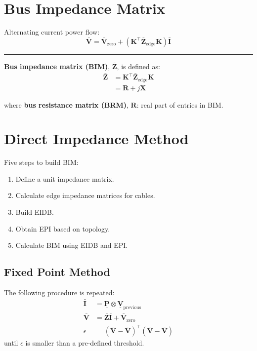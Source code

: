 \documentclass[
]{book}
\providecommand{\tightlist}{%
  \setlength{\itemsep}{0pt}\setlength{\parskip}{0pt}}
\begin{document}
\hypertarget{BIM}{%
\section{Bus Impedance Matrix}\label{BIM}}

Alternating current power flow:
\[
  \bar{\boldsymbol{V}} = \bar{\boldsymbol{V}}_{\text{zero}}
    + \left( \boldsymbol{K}^{\top} \boldsymbol{\bar{Z}}_\text{edge}
    \boldsymbol{K} \right) \bar{\boldsymbol{I}}
\]

\begin{center}\rule{0.5\linewidth}{0.5pt}\end{center}

\textbf{Bus impedance matrix (BIM)}, \(\boldsymbol{\bar{Z}}\), is defined as:
\[ \begin{aligned}
  \boldsymbol{\bar{Z}}
    &= \boldsymbol{K}^{\top} \boldsymbol{\bar{Z}}_\text{edge}
    \boldsymbol{K} \\
    &= \boldsymbol{R} + j \boldsymbol{X}
\end{aligned} \]

where \textbf{bus resistance matrix (BRM)}, \(\boldsymbol{R}\): real part of entries
in BIM.

\hypertarget{power-flow}{%
\section{Direct Impedance Method}\label{power-flow}}

Five steps to build BIM:

\begin{enumerate}
\def\labelenumi{\arabic{enumi}.}
\tightlist
\item
  Define a unit impedance matrix.
\item
  Calculate edge impedance matrices for cables.
\item
  Build EIDB.
\item
  Obtain EPI based on topology.
\item
  Calculate BIM using EIDB and EPI.
\end{enumerate}

\hypertarget{fixed-point-method}{%
\subsection*{Fixed Point Method}\label{fixed-point-method}}

The following procedure is repeated:
\[ \begin{aligned}
    \boldsymbol{\bar{I}} &= \boldsymbol{\underline{P}}
      \otimes \boldsymbol{\underline{V}}_\text{previous} \\
    \boldsymbol{\bar{V}}
    &= \boldsymbol{\bar{Z}} \boldsymbol{\bar{I}}
      + \boldsymbol{\bar{V}}_\text{zero} \\
    \epsilon
    &= \left( \boldsymbol{\bar{V}} - \boldsymbol{\bar{V}} \right)^\top
      \left( \boldsymbol{\bar{V}} - \boldsymbol{\bar{V}} \right)
\end{aligned} \]
until \(\epsilon\) is smaller than a pre-defined threshold.
\end{document}
